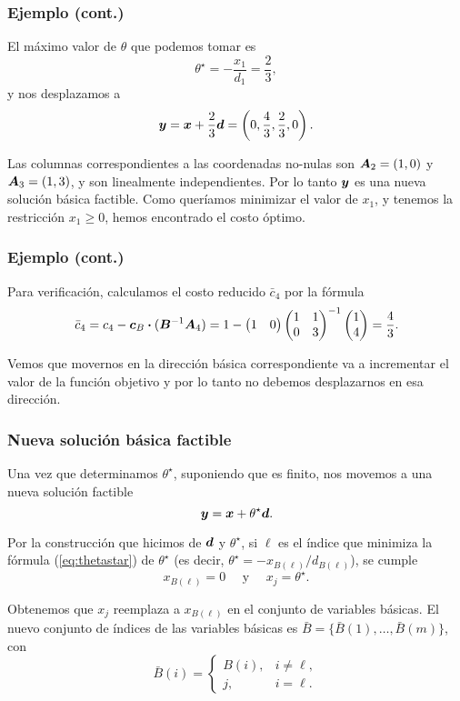\documentclass[aspectratio=169,12pt,spanish]{beamer}
\begin{document}

\begin{frame}
\frametitle{Ejemplo (cont.)}

El máximo valor de $\theta$ que podemos tomar es
$$
\theta^\star = -\frac{x_1}{d_1} = \frac{2}{3},
$$
y nos desplazamos a
$$
\bm{y} = \bm{x} + \frac{2}{3} \bm{d} = \left(0, \frac{4}{3}, \frac{2}{3}, 0\right).
$$

Las columnas correspondientes a las coordenadas no-nulas son $\bm{A}_2 = (1, 0)$ y $\bm{A}_3 = (1,3)$, y son linealmente independientes. Por lo tanto $\bm{y}$ es una nueva solución básica factible. Como queríamos minimizar el valor de $x_1$, y tenemos la restricción $x_1 \ge 0$, hemos encontrado el costo óptimo.

\end{frame}


\begin{frame}
\frametitle{Ejemplo (cont.)}

Para verificación, calculamos el costo reducido $\bar c_4$ por la fórmula
$$
\bar c_4 = c_4 - \bm{c}_B \boldsymbol{\cdot} (\bm{B}^{-1} \bm{A}_4) = 1 - \begin{pmatrix} 1 & 0 \end{pmatrix} \begin{pmatrix} 1 & 1 \\ 0 & 3 \end{pmatrix}^{-1}
\begin{pmatrix} 1 \\ 4 \end{pmatrix} = \frac{4}{3}.
$$

Vemos que movernos en la dirección básica correspondiente va a incrementar el valor de la función objetivo y por lo tanto no debemos desplazarnos en esa dirección.

\end{frame}


\begin{frame}
\frametitle{Nueva solución básica factible}

Una vez que determinamos $\theta^\star$, suponiendo que es finito, nos movemos a una nueva solución factible
$$
\bm{y} = \bm{x} + \theta^\star \bm{d}.
$$

Por la construcción que hicimos de $\bm{d}$ y $\theta^\star$, si $\ell$ es el índice que minimiza la fórmula (\ref{eq:thetastar}) de $\theta^\star$ (es decir, $\theta^\star = -x_{B(\ell)} / d_{B(\ell)}$), se cumple
$$
x_{B(\ell)} = 0 \quad \text{ y } \quad x_j = \theta^\star.
$$

Obtenemos que $x_j$ reemplaza a $x_{B(\ell)}$ en el conjunto de variables básicas. El nuevo conjunto de índices de las variables básicas es $\bar B = \{\bar B(1), \dots, \bar B(m)\}$, con
$$
\bar B(i) = \begin{cases}
B(i), & i \neq \ell,\\
j, &i = \ell.
\end{cases}
$$

\end{frame}
\end{document}
